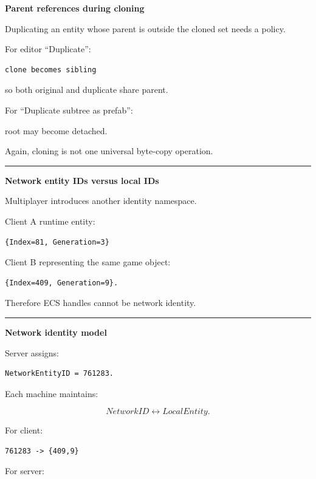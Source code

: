 \textbf{Parent references during cloning}

Duplicating an entity whose parent is outside the cloned set needs a policy.

For editor ``Duplicate'':

\begin{verbatim}
clone becomes sibling
\end{verbatim}

so both original and duplicate share parent.

For ``Duplicate subtree as prefab'':

root may become detached.

Again, cloning is not one universal byte-copy operation.

\begin{center}\rule{0.5\linewidth}{0.5pt}\end{center}

\textbf{Network entity IDs versus local IDs}

Multiplayer introduces another identity namespace.

Client A runtime entity:

\begin{verbatim}
{Index=81, Generation=3}
\end{verbatim}

Client B representing the same game object:

\begin{verbatim}
{Index=409, Generation=9}.
\end{verbatim}

Therefore ECS handles cannot be network identity.

\begin{center}\rule{0.5\linewidth}{0.5pt}\end{center}

\textbf{Network identity model}

Server assigns:

\begin{verbatim}
NetworkEntityID = 761283.
\end{verbatim}

Each machine maintains:

\[
NetworkID
\leftrightarrow
LocalEntity.
\]

For client:

\begin{verbatim}
761283 -> {409,9}
\end{verbatim}

For server:

